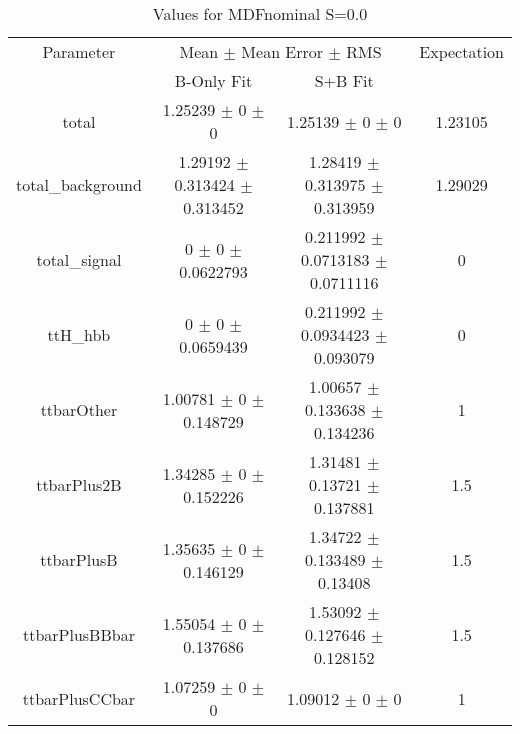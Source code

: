 \begin{table}
\centering
\caption{Values for MDFnominal S=0.0}
\begin{tabular}{cccc}
\toprule
Parameter & \multicolumn{2}{c}{Mean $\pm$ Mean Error $\pm$ RMS} & Expectation\\
 & B-Only Fit & S+B Fit & \\
\midrule
total & \num{1.25239} $\pm$ \num{0} $\pm$ \num{0} & \num{1.25139} $\pm$ \num{0} $\pm$ \num{0} & \num{1.23105}\\
total\_background & \num{1.29192} $\pm$ \num{0.313424} $\pm$ \num{0.313452} & \num{1.28419} $\pm$ \num{0.313975} $\pm$ \num{0.313959} & \num{1.29029}\\
total\_signal & \num{0} $\pm$ \num{0} $\pm$ \num{0.0622793} & \num{0.211992} $\pm$ \num{0.0713183} $\pm$ \num{0.0711116} & \num{0}\\
ttH\_hbb & \num{0} $\pm$ \num{0} $\pm$ \num{0.0659439} & \num{0.211992} $\pm$ \num{0.0934423} $\pm$ \num{0.093079} & \num{0}\\
ttbarOther & \num{1.00781} $\pm$ \num{0} $\pm$ \num{0.148729} & \num{1.00657} $\pm$ \num{0.133638} $\pm$ \num{0.134236} & \num{1}\\
ttbarPlus2B & \num{1.34285} $\pm$ \num{0} $\pm$ \num{0.152226} & \num{1.31481} $\pm$ \num{0.13721} $\pm$ \num{0.137881} & \num{1.5}\\
ttbarPlusB & \num{1.35635} $\pm$ \num{0} $\pm$ \num{0.146129} & \num{1.34722} $\pm$ \num{0.133489} $\pm$ \num{0.13408} & \num{1.5}\\
ttbarPlusBBbar & \num{1.55054} $\pm$ \num{0} $\pm$ \num{0.137686} & \num{1.53092} $\pm$ \num{0.127646} $\pm$ \num{0.128152} & \num{1.5}\\
ttbarPlusCCbar & \num{1.07259} $\pm$ \num{0} $\pm$ \num{0} & \num{1.09012} $\pm$ \num{0} $\pm$ \num{0} & \num{1}\\
\bottomrule
\end{tabular}
\end{table}